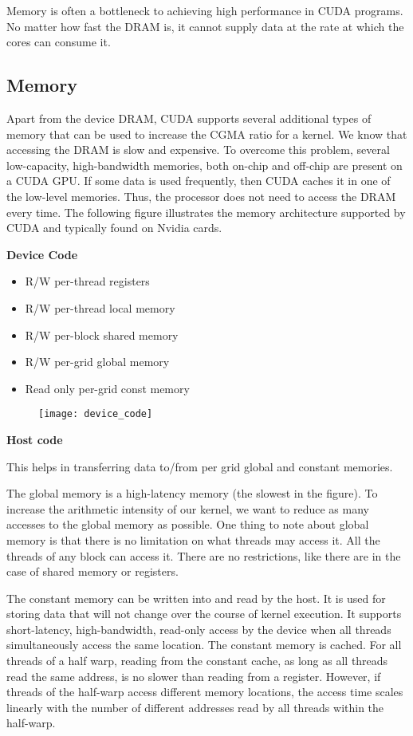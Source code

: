 \documentclass[../notes.tex]{subfiles}
\begin{document}
Memory is often a bottleneck to achieving high performance in CUDA programs. No matter how fast the DRAM is, it cannot supply data at the rate at which the cores can consume it.

\newpage

\subsection{Memory}
Apart from the device DRAM, CUDA supports several additional types of memory that can be used to increase the CGMA ratio for a kernel. We know that accessing the DRAM is slow and expensive. To overcome this problem, several low-capacity, high-bandwidth memories, both on-chip and off-chip are present on a CUDA GPU. If some data is used frequently, then CUDA caches it in one of the low-level memories. Thus, the processor does not need to access the DRAM every time. The following figure illustrates the memory architecture supported by CUDA and typically found on Nvidia cards.

\textbf{Device Code}
\begin{itemize}
\item R/W per-thread registers
\item R/W per-thread local memory
\item R/W per-block shared memory
\item R/W per-grid global memory
\item Read only per-grid const memory
\end{itemize}

\begin{figure}[h]
  \texttt{[image: device\_code]}
\end{figure}

\textbf{Host code}

This helps in transferring data to/from per grid global and constant memories. 

The global memory is a high-latency memory (the slowest in the figure). To increase the arithmetic intensity of our kernel, we want to reduce as many accesses to the global memory as possible. One thing to note about global memory is that there is no limitation on what threads may access it. All the threads of any block can access it. There are no restrictions, like there are in the case of shared memory or registers.

The constant memory can be written into and read by the host. It is used for storing data that will not change over the course of kernel execution. It supports short-latency, high-bandwidth, read-only access by the device when all threads simultaneously access the same location. The constant memory is cached. For all threads of a half warp, reading from the constant cache, as long as all threads read the same address, is no slower than reading from a register. However, if threads of the half-warp access different memory locations, the access time scales linearly with the number of different addresses read by all threads within the half-warp.
\end{document}
